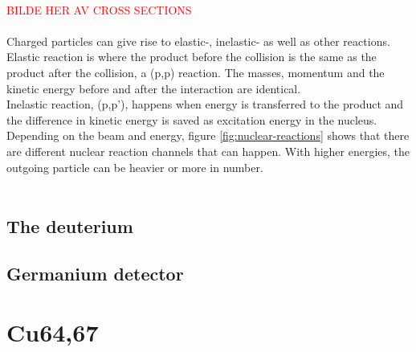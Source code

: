 \documentclass[twoside,english]{uiofysmaster/uiofysmaster}
\begin{document}
\\
\textcolor{red}{BILDE HER AV CROSS SECTIONS}
\\
\\
Charged particles can give rise to elastic-, inelastic- as well as other reactions. Elastic reaction is where the product before the collision is the same as the product after the collision, a (p,p) reaction. The masses, momentum and the kinetic energy before and after the interaction are identical\cite{Nuclear_medicine}.\\
Inelastic reaction, (p,p'), happens when energy is transferred to the product and the difference in kinetic energy is saved as excitation energy in the nucleus.
\noindent
Depending on the beam and energy, figure \ref{fig:nuclear-reactions} shows that there are different nuclear reaction channels that can happen. With higher energies, the outgoing particle can be heavier or more in number. 
\\
\\

\section{The deuterium}
\label{sec:deuterium}

\section{Germanium detector}
\label{sec:ge-detector}






\chapter{Cu64,67} 
\label{ch: mywork}
\end{document}
